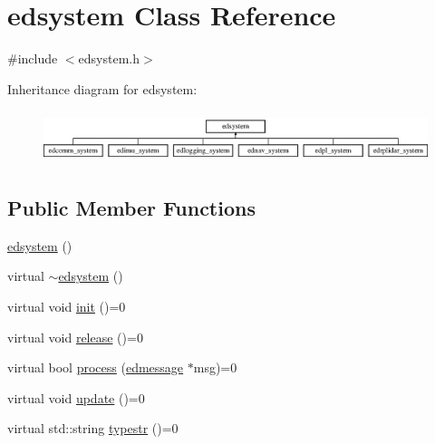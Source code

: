 \hypertarget{classedsystem}{\section{edsystem Class Reference}
\label{classedsystem}
}


{\ttfamily \#include $<$edsystem.\-h$>$}

Inheritance diagram for edsystem\-:\begin{figure}[H]
\begin{center}
\leavevmode
\includegraphics[height=1.555556cm]{classedsystem}
\end{center}
\end{figure}
\subsection*{Public Member Functions}
\begin{DoxyCompactItemize}
\item 
\hyperlink{classedsystem_af87c5a01f7cf70dcc788bbf1dbd8aeb1}{edsystem} ()
\item 
virtual \hyperlink{classedsystem_af3022d068ee9dda5b7da8438680e6437}{$\sim$edsystem} ()
\item 
virtual void \hyperlink{classedsystem_a4c70e3568064941607fb220aea826a56}{init} ()=0
\item 
virtual void \hyperlink{classedsystem_af40ac185ca4a8efd6777fdb4c65880ea}{release} ()=0
\item 
virtual bool \hyperlink{classedsystem_a9d7a0547c702af1572ed8a1f5434fa0a}{process} (\hyperlink{structedmessage}{edmessage} $\ast$msg)=0
\item 
virtual void \hyperlink{classedsystem_afd5308dc71350fe4e239cac5fb1bdbe9}{update} ()=0
\item 
virtual std\-::string \hyperlink{classedsystem_a19dc65111f9a38259fcafba3a32a646d}{typestr} ()=0
\end{DoxyCompactItemize}


